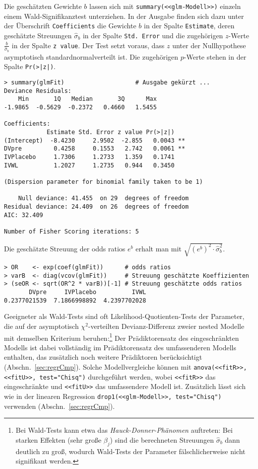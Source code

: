 Die geschätzten Gewichte $b$ lassen sich mit \lstinline!summary(<<glm-Modell>>)! einzeln einem Wald-Signifikanztest unterziehen. In der Ausgabe finden sich dazu unter der Überschrift \lstinline!Coefficients! die Gewichte $b$ in der Spalte \lstinline!Estimate!, deren geschätzte Streuungen $\hat{\sigma}_{b}$ in der Spalte \lstinline!Std. Error! und die zugehörigen $z$-Werte $\frac{b}{\hat{\sigma}_{b}}$ in der Spalte \lstinline!z value!. Der Test setzt voraus, dass $z$ unter der Nullhypothese asymptotisch standardnormalverteilt ist. Die zugehörigen $p$-Werte stehen in der Spalte \lstinline!Pr(>|z|)!.
\begin{lstlisting}
> summary(glmFit)                    # Ausgabe gekürzt ...
Deviance Residuals:
    Min       1Q   Median       3Q      Max
-1.9865  -0.5629  -0.2372   0.4660   1.5455

Coefficients:
            Estimate Std. Error z value Pr(>|z|)
(Intercept)  -8.4230     2.9502  -2.855   0.0043 **
DVpre         0.4258     0.1553   2.742   0.0061 **
IVPlacebo     1.7306     1.2733   1.359   0.1741
IVWL          1.2027     1.2735   0.944   0.3450

(Dispersion parameter for binomial family taken to be 1)

    Null deviance: 41.455  on 29  degrees of freedom
Residual deviance: 24.409  on 26  degrees of freedom
AIC: 32.409

Number of Fisher Scoring iterations: 5
\end{lstlisting}

Die geschätzte Streuung der odds ratios $e^{b}$ erhalt man mit $\sqrt{\left(e^{b}\right)^{2} \cdot \hat{\sigma}^{2}_{b}}$.
\begin{lstlisting}
> OR    <- exp(coef(glmFit))      # odds ratios
> varB  <- diag(vcov(glmFit))     # Streuung geschätzte Koeffizienten
> (seOR <- sqrt(OR^2 * varB))[-1] # Streuung geschätzte odds ratios
       DVpre     IVPlacebo          IVWL
0.2377021539  7.1866998892  4.2397702028
\end{lstlisting}

Geeigneter als Wald-Tests sind oft Likelihood-Quotienten-Tests der Parameter, die auf der asymptotisch $\chi^{2}$-verteilten Devianz-Differenz zweier nested Modelle mit demselben Kriterium beruhen:\footnote{\label{ftn:HauckDonner}Bei Wald-Tests kann etwa das \emph{Hauck-Donner-Phänomen} auftreten: Bei starken Effekten (sehr große $\beta_{j}$) sind die berechneten Streuungen $\hat{\sigma}_{b}$ dann deutlich zu groß, wodurch Wald-Tests der Parameter fälschlicherweise nicht signifikant werden.} Der Prädiktorensatz des eingeschränkten Modells ist dabei vollständig im Prädiktorensatz des umfassenderen Modells enthalten, das zusätzlich noch weitere Prädiktoren berücksichtigt (Abschn.\ \ref{sec:regrCmp}). Solche Modellvergleiche können mit \lstinline!anova(<<fitR>>, <<fitU>>, test="Chisq")! durchgeführt werden, wobei \lstinline!<<fitR>>! das eingeschränkte und \lstinline!<<fitU>>! das umfassendere Modell ist. Zusätzlich lässt sich wie in der linearen Regression \lstinline!drop1(<<glm-Modell>>, test="Chisq")! verwenden (Abschn.\ \ref{sec:regrCmp}).

